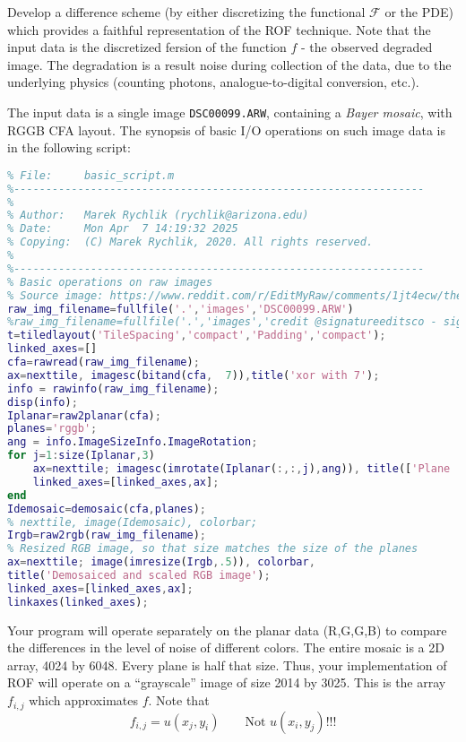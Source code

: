 \documentclass{article}
\begin{document}
Develop a difference scheme (by either discretizing the functional \(\mathcal{F}\) or the PDE)
which provides a faithful representation of the ROF technique. Note that
the input data is the discretized fersion of the function \(f\) - the observed degraded image.
The degradation is a result noise during collection of the data, due to the underlying
physics (counting photons, analogue-to-digital conversion, etc.).

The input data is a single image \texttt{DSC00099.ARW}, containing
a \emph{Bayer mosaic}, with RGGB CFA layout. The synopsis of
basic I/O operations on such image data is in the following script:

\begin{lstlisting}[language=MATLAB, caption={Processing of raw images}]
%----------------------------------------------------------------
% File:     basic_script.m
%----------------------------------------------------------------
%
% Author:   Marek Rychlik (rychlik@arizona.edu)
% Date:     Mon Apr  7 14:19:32 2025
% Copying:  (C) Marek Rychlik, 2020. All rights reserved.
% 
%----------------------------------------------------------------
% Basic operations on raw images
% Source image: https://www.reddit.com/r/EditMyRaw/comments/1jt4ecw/the_official_weekly_raw_editing_challenge/
raw_img_filename=fullfile('.','images','DSC00099.ARW')
%raw_img_filename=fullfile('.','images','credit @signatureeditsco - signatureedits.com _DSC4583.dng')
t=tiledlayout('TileSpacing','compact','Padding','compact');
linked_axes=[]
cfa=rawread(raw_img_filename);
ax=nexttile, imagesc(bitand(cfa,  7)),title('xor with 7');
info = rawinfo(raw_img_filename);
disp(info);
Iplanar=raw2planar(cfa);
planes='rggb';
ang = info.ImageSizeInfo.ImageRotation;
for j=1:size(Iplanar,3)
    ax=nexttile; imagesc(imrotate(Iplanar(:,:,j),ang)), title(['Plane ',num2str(j),': ', planes(j)]), colorbar, colormap gray
    linked_axes=[linked_axes,ax];
end
Idemosaic=demosaic(cfa,planes);
% nexttile, image(Idemosaic), colorbar;
Irgb=raw2rgb(raw_img_filename);
% Resized RGB image, so that size matches the size of the planes
ax=nexttile; image(imresize(Irgb,.5)), colorbar,
title('Demosaiced and scaled RGB image');
linked_axes=[linked_axes,ax];
linkaxes(linked_axes);
\end{lstlisting}

Your program will operate separately on the planar data (R,G,G,B) to
compare the differences in the level of noise of different colors.
The entire mosaic is a 2D array, 4024 by 6048. Every plane is half
that size.  Thus, your implementation of ROF will operate on a
``grayscale'' image of size 2014 by 3025. This is the array
\(f_{i,j}\) which approximates \(f\). Note that
\[f_{i,j} = u(x_j, y_i) \qquad \text{Not \(u(x_i,y_j)\)!!!}\]
\end{document}
